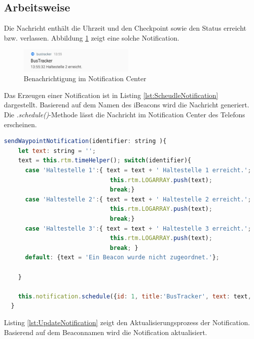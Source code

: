 \subsection{Arbeitsweise}
 Die Nachricht enthält die Uhrzeit und den Checkpoint sowie den Status erreicht bzw. verlassen. Abbildung \ref{fig:Notification} zeigt eine solche Notification.
 
\begin{figure}[htbp] 
  \centering
     \includegraphics[width=0.5\textwidth]{images/Notification.png}
	   \caption{Benachrichtigung im Notification Center}
  \label{fig:Notification}
\end{figure}

Das Erzeugen einer Notification ist in Listing \ref{lst:ScheudleNotification} dargestellt. Basierend auf dem Namen des iBeacons wird die Nachricht generiert. Die \emph{.schedule()}-Methode lässt die Nachricht im Notification Center des Telefons erscheinen.

\begin{lstlisting}[float, language=JavaScript, caption= Erzeugen einer Notification bei Erreichen einer Haltestelle , label=lst:ScheudleNotification]
sendWaypointNotification(identifier: string ){
    let text: string = '';
    text = this.rtm.timeHelper(); switch(identifier){
      case 'Haltestelle 1':{ text = text + ' Haltestelle 1 erreicht.';
                              this.rtm.LOGARRAY.push(text);
                              break;}
      case 'Haltestelle 2':{ text = text + ' Haltestelle 2 erreicht.';
                              this.rtm.LOGARRAY.push(text);
                              break;}
      case 'Haltestelle 3':{ text = text + ' Haltestelle 3 erreicht.';
                              this.rtm.LOGARRAY.push(text);
                              break; }
      default: {text = 'Ein Beacon wurde nicht zugeordnet.'};

    }

    this.notification.schedule({id: 1, title:'BusTracker', text: text, led:'#FF0000'});
  }
\end{lstlisting}

Listing \ref{lst:UpdateNotification} zeigt den Aktualisierungsprozess der Notification. Basierend auf dem Beaconnamen wird die Notification aktualisiert.

